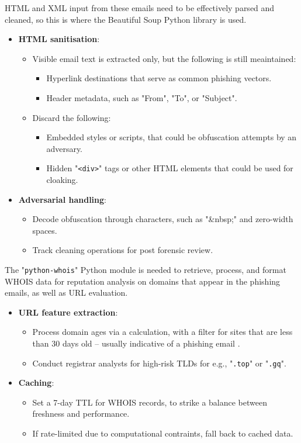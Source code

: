 \noindent HTML and XML input from these emails need to be effectively parsed and cleaned, so this is where the Beautiful Soup Python library is used.

\begin{itemize}
  \item \textbf{HTML sanitisation}:
  \begin{itemize}
    \item Visible email text is extracted only, but the following is still meaintained:
    \begin{itemize}
      \item Hyperlink destinations that serve as common phishing vectors.
      \item Header metadata, such as "From", "To", or "Subject".
    \end{itemize}
    \item Discard the following:
    \begin{itemize}
      \item Embedded styles or scripts, that could be obfuscation attempts by an adversary.
      \item Hidden "\texttt{<div>}" tags or other HTML elements that could be used for cloaking.
    \end{itemize}
  \end{itemize}
  \item \textbf{Adversarial handling}:
  \begin{itemize}
    \item Decode obfuscation through characters, such as "\&nbsp;" and zero-width spaces.
    \item Track cleaning operations for post forensic review.
  \end{itemize}
\end{itemize}

\noindent The "\texttt{python-whois}" Python module is needed to retrieve, process, and format WHOIS data for reputation analysis on domains that appear in the phishing emails, as well as URL evaluation.

\begin{itemize}
  \item \textbf{URL feature extraction}:
  \begin{itemize}
    \item Process domain ages via a calculation, with a filter for sites that are less than 30 days old -- usually indicative of a phishing email \citep{palaniappan2020malicious}.
    \item Conduct registrar analysts for high-risk TLDs for e.g., "\texttt{.top}" or "\texttt{.gq}".
  \end{itemize}
  \item \textbf{Caching}:
  \begin{itemize}
    \item Set a 7-day TTL for WHOIS records, to strike a balance between freshness and performance.
    \item If rate-limited due to computational contraints, fall back to cached data.
  \end{itemize}
\end{itemize}
